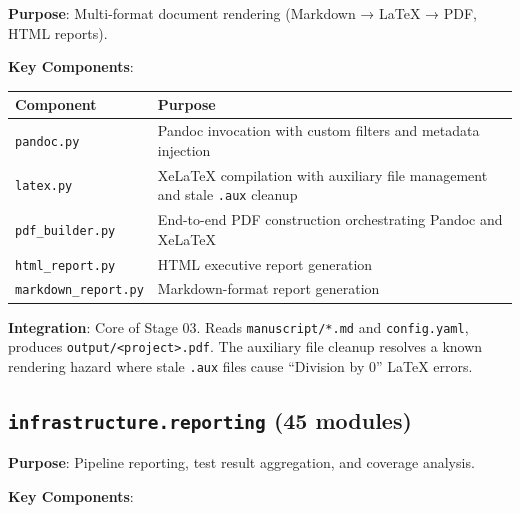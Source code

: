 \documentclass[
]{article}
\newcounter{none} %
\begin{document}
\textbf{Purpose}: Multi-format document rendering (Markdown → LaTeX →
PDF, HTML reports).

\textbf{Key Components}:

{\def\LTcaptype{none} %
\begin{longtable}[]{@{}
  >{\raggedright\arraybackslash}p{}
  >{\raggedright\arraybackslash}p{}@{}}
\toprule\noalign{}
\begin{minipage}[b]{\linewidth}\raggedright
Component
\end{minipage} & \begin{minipage}[b]{\linewidth}\raggedright
Purpose
\end{minipage} \\
\midrule\noalign{}
\endhead
\bottomrule\noalign{}
\endlastfoot
\texttt{pandoc.py} & Pandoc invocation with custom filters and metadata
injection \\
\texttt{latex.py} & XeLaTeX compilation with auxiliary file management
and stale \texttt{.aux} cleanup \\
\texttt{pdf\_builder.py} & End-to-end PDF construction orchestrating
Pandoc and XeLaTeX \\
\texttt{html\_report.py} & HTML executive report generation \\
\texttt{markdown\_report.py} & Markdown-format report generation \\
\end{longtable}
}

\textbf{Integration}: Core of Stage 03. Reads \texttt{manuscript/*.md}
and \texttt{config.yaml}, produces
\texttt{output/\textless{}project\textgreater{}.pdf}. The auxiliary file
cleanup resolves a known rendering hazard where stale \texttt{.aux}
files cause ``Division by 0'' LaTeX errors.

\subsection{\texorpdfstring{\texttt{infrastructure.reporting} (45
modules)}{infrastructure.reporting (45 modules)}}\label{infrastructure.reporting-45-modules}

\textbf{Purpose}: Pipeline reporting, test result aggregation, and
coverage analysis.

\textbf{Key Components}:
\end{document}
